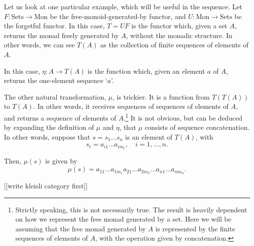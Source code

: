 \documentclass[11pt]{article}
\theoremstyle{nonumberplain}
\newcommand{\cat}[1]{\mathrm{#1}}
\begin{document}
Let us look at one particular example, which will be useful in the sequence. Let $F \colon \cat{Sets} \to \cat{Mon}$ be the free-monoid-generated-by functor, and $U \colon \cat{Mon} \to \cat{Sets}$ be the forgetful functor. In this case, $T = UF$ is the functor which, given a set $A$, returns the monad freely generated by $A$, without the monadic structure. In other words, we can see $T(A)$ as the collection of finite sequences of elements of $A$.

In this case, $\eta \colon A \to T(A)$ is the function which, given an element $a$ of $A$, returns the one-element sequence `$a$'.

The other natural transformation, $\mu$, is trickier. It is a function from $T(T(A))$ to $T(A)$. In other words, it receives sequences of sequences of elements of $A$, and returns a sequence of elements of $A$.\footnote{Strictly speaking, this is not necessarily true. The result is heavily dependent on how we represent the free monad generated by a set. Here we will be assuming that the free monad generated by $A$ is represented by the finite sequences of elements of $A$, with the operation given by concatenation.} It is not obvious, but can be deduced by expanding the definition of $\mu$ and $\eta$, that $\mu$ consists of sequence concatenation. In other words, suppose that $s = s_1 \dots s_n$ is an element of $T(A)$, with
\begin{equation}
s_i = a_{i1} \dots a_{i m_i}, \quad i = 1, \dots, n.
\end{equation}

Then, $\mu(s)$ is given by
\begin{equation}
\mu(s) = a_{11} \dots a_{1 m_1} a_{21} \dots a_{2 m_2} \dots a_{n1} \dots a_{n m_n}.
\end{equation}

[[write kleisli category first]]



\end{document}
